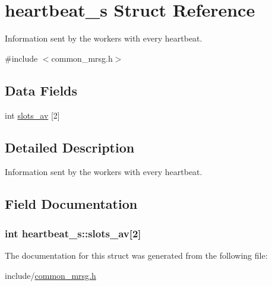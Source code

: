 \hypertarget{structheartbeat__s}{\section{heartbeat\-\_\-s \-Struct \-Reference}
\label{structheartbeat__s}
}


\-Information sent by the workers with every heartbeat.  




{\ttfamily \#include $<$common\-\_\-mrsg.\-h$>$}

\subsection*{\-Data \-Fields}
\begin{DoxyCompactItemize}
\item 
int \hyperlink{structheartbeat__s_ad000528a00b30a975f1c01fdc61f5a30}{slots\-\_\-av} \mbox{[}2\mbox{]}
\end{DoxyCompactItemize}


\subsection{\-Detailed \-Description}
\-Information sent by the workers with every heartbeat. 

\subsection{\-Field \-Documentation}
\hypertarget{structheartbeat__s_ad000528a00b30a975f1c01fdc61f5a30}{
\subsubsection[{slots\-\_\-av}]{\setlength{\rightskip}{0pt plus 5cm}int {\bf heartbeat\-\_\-s\-::slots\-\_\-av}\mbox{[}2\mbox{]}}}\label{structheartbeat__s_ad000528a00b30a975f1c01fdc61f5a30}


\-The documentation for this struct was generated from the following file\-:\begin{DoxyCompactItemize}
\item 
include/\hyperlink{common__mrsg_8h}{common\-\_\-mrsg.\-h}\end{DoxyCompactItemize}
